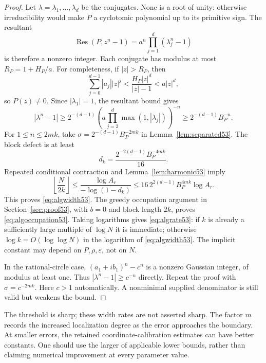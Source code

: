\documentclass[11pt]{amsart}
\numberwithin{equation}{section}
\theoremstyle{definition}
\theoremstyle{remark}
\begin{document}
\begin{proof}
Let $\lambda=\lambda_1,\ldots,\lambda_d$ be the conjugates. None is a root of unity: otherwise irreducibility would make $P$ a cyclotomic polynomial up to its primitive sign. The resultant
\[
 \operatorname{Res}(P,z^n-1)=a^n\prod_{j=1}^d(\lambda_j^n-1)
\]
is therefore a nonzero integer. Each conjugate has modulus at most $R_P=1+H_P/a$. For completeness, if $|z|>R_P$, then
\[
 \sum_{j=0}^{d-1}|a_j||z|^j
 <\frac{H_P|z|^d}{|z|-1}<a|z|^d,
\]
so $P(z)\ne0$. Since $|\lambda_1|=1$, the resultant bound gives
\begin{equation}\label{eq:resultant53}
 |\lambda^n-1|\ge
 2^{-(d-1)}\left(a\prod_{j=2}^d\max(1,|\lambda_j|)\right)^{-n}
 \ge 2^{-(d-1)}B_P^{-n}.
\end{equation}
For $1\le n\le2mk$, take $\sigma=2^{-(d-1)}B_P^{-2mk}$ in Lemma~\ref{lem:separated53}. The block defect is at least
\[
                  d_k=\frac{2^{-2(d-1)}B_P^{-4mk}}{16}.
\]
Repeated conditional contraction and Lemma~\ref{lem:harmonic53} imply
\[
 \left\lfloor\frac{N}{2k}\right\rfloor
 \le \frac{\log A_r}{-\log(1-d_k)}
 \le 16\,2^{2(d-1)}B_P^{4mk}\log A_r.
\]
This proves \eqref{eq:algwidth53}. The greedy occupation argument in Section~\ref{sec:proof53}, with $b=0$ and block length $2k$, proves \eqref{eq:algoccupation53}. Taking logarithms gives \eqref{eq:algrate53}: if $k$ is already a sufficiently large multiple of $\log N$ it is immediate; otherwise $\log k=O(\log\log N)$ in the logarithm of \eqref{eq:algwidth53}. The implicit constant may depend on $P,\rho,\varepsilon$, not on $N$.

In the rational-circle case, $(a_1+ib_1)^n-c^n$ is a nonzero Gaussian integer, of modulus at least one. Thus $|\lambda^n-1|\ge c^{-n}$ directly. Repeat the proof with $\sigma=c^{-2mk}$. Here $c>1$ automatically. A nonminimal supplied denominator is still valid but weakens the bound.
\end{proof}
The threshold is sharp; these width rates are not asserted sharp. The factor $m$ records the increased localization degree as the error approaches the boundary. At smaller errors, the retained coordinate-calibration estimates can have better constants. One should use the larger of applicable lower bounds, rather than claiming numerical improvement at every parameter value.
\end{document}
